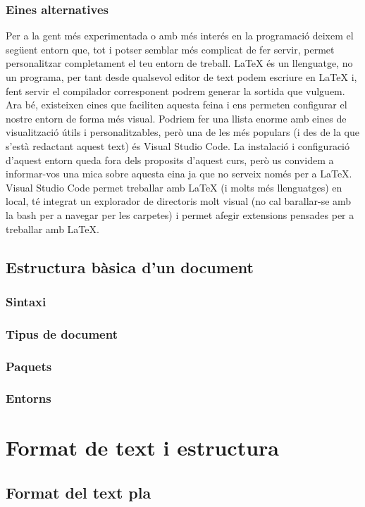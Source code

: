 \documentclass[15pt,twosides,onecolumn,openany]{book}
\begin{document}
\subsection{Eines alternatives}
Per a la gent més experimentada o amb més interés en la programació deixem el següent entorn que, tot i potser semblar més complicat de fer servir, permet personalitzar completament el teu entorn de treball. LaTeX és un llenguatge, no un programa, per tant desde qualsevol editor de text podem escriure en LaTeX i, fent servir el compilador corresponent podrem generar la sortida que vulguem. Ara bé, existeixen eines que faciliten aquesta feina i ens permeten configurar el nostre entorn de forma més visual. Podriem fer una llista enorme amb eines de visualització útils i personalitzables, però una de les més populars (i des de la que s'està redactant aquest text) és Visual Studio Code. La instalació i configuració d'aquest entorn queda fora dels proposits d'aquest curs, però us convidem a informar-vos una mica sobre aquesta eina ja que no serveix només per a LaTeX. Visual Studio Code permet treballar amb LaTeX (i molts més llenguatges) en local, té integrat un explorador de directoris molt visual (no cal barallar-se amb la bash per a navegar per les carpetes) i permet afegir extensions pensades per a treballar amb LaTeX.
\section{Estructura bàsica d'un document}
\subsection{Sintaxi}
\subsection{Tipus de document}
\subsection{Paquets}
\subsection{Entorns}

\chapter{Format de text i estructura}
\thispagestyle{empty}
\section{Format del text pla}
\end{document}
